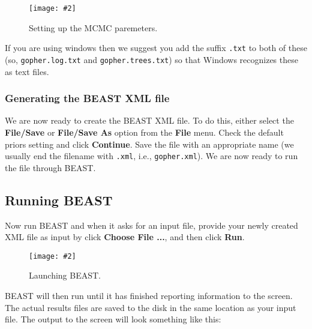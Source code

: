 \documentclass{article}
\newcommand{\includeimage}[2][]{%
\texttt{[image: \#2]}
}
\begin{document}

\begin{figure}
\centering
\includeimage[width=\textwidth]{figures/BEAUti_MCMC}

\caption{\label{fig.MCMC} Setting up the MCMC paremeters.}
\end{figure}


If you are using windows then we suggest you add the suffix \texttt{.txt} to both of these (so,
\texttt{gopher.log.txt} and \texttt{gopher.trees.txt}) so that Windows recognizes
these as text files. 

\subsubsection*{Generating the BEAST XML file }

We are now ready to create the BEAST XML file. To do this, either select the {\bf File/Save} or {\bf File/Save As} option from the \textbf{File} menu. Check the default priors setting and click \textbf{Continue}. Save the file with an appropriate name (we usually end the filename with \texttt{.xml}, i.e., \texttt{gopher.xml}). We are now ready to run the file through BEAST. 

\subsection*{Running BEAST }

Now run BEAST and when it asks for an input file, provide your newly
created XML file as input by click \textbf{Choose File ...}, and then click \textbf{Run}. 

\begin{figure}
\centering
\includeimage[width=0.8\textwidth]{figures/BEAST}

\caption{\label{fig.BEAST} Launching BEAST.}
\end{figure}


BEAST will then run until it has finished
reporting information to the screen. The actual results files are
saved to the disk in the same location as your input file. The output to the screen will
look something like this: 
\end{document}
